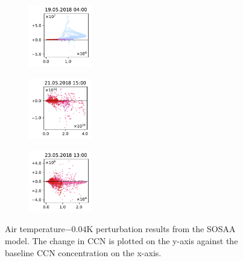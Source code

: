 \begin{figure}[H]
    \begin{subfigure}
        \centering
        \includegraphics[width=0.30\textwidth,valign=t]{evaluation/figures/perturbations/perturbation-19.05.2018:04.00-temperature-sub-0.04K.pdf}
    \end{subfigure}
    \begin{subfigure}
        \centering
        \includegraphics[width=0.30\textwidth,valign=t]{evaluation/figures/perturbations/perturbation-21.05.2018:15.00-temperature-sub-0.04K.pdf}
    \end{subfigure}
    \begin{subfigure}
        \centering
        \includegraphics[width=0.30\textwidth,valign=t]{evaluation/figures/perturbations/perturbation-23.05.2018:13.00-temperature-sub-0.04K.pdf}
    \end{subfigure}

    \caption[Temperature$- 0.04\text{K}$ perturbation SOSAA results]{Air temperature$- 0.04\text{K}$ perturbation results from the SOSAA model. The change in CCN is plotted on the y-axis against the baseline CCN concentration on the x-axis.}
    \label{fig:sosaa-perturbation-temperature-sub-0.04K}
\end{figure}

